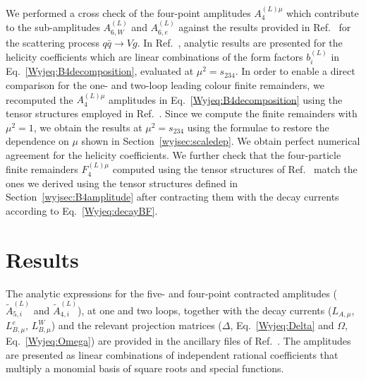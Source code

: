 \documentclass[main.tex]{subfiles}
\begin{document}
We performed a cross check of the four-point amplitudes $A_4^{(L)\mu}$ which contribute to the sub-amplitudes $A^{(L)}_{6,W}$ and $A^{(L)}_{6,e}$ against the results provided in Ref.~\cite{Gehrmann:2011ab} for the scattering process $q\bar{q}\to Vg$. In Ref.~\cite{Gehrmann:2011ab}, analytic results are presented 
for the helicity coefficients which are linear combinations of the form factors $b_i^{(L)}$ in Eq.~\ref{Wyjeq:B4decomposition}, evaluated at $\mu^2 = s_{234}$.
In order to enable a direct comparison for the one- and two-loop leading colour finite remainders, we 
recomputed the $A_4^{(L)\mu}$ amplitudes in Eq.~\ref{Wyjeq:B4decomposition} using the tensor structures employed in Ref.~\cite{Gehrmann:2011ab}.
Since we compute the finite remainders with $\mu^2=1$, we obtain the results at $\mu^2=s_{234}$ using the formulae to restore the dependence on $\mu$ shown in Section~\ref{wyjsec:scaledep}. We obtain perfect numerical agreement for the helicity coefficients. We further check that the four-particle finite remainders $F_4^{(L)\mu}$ computed using the tensor structures of Ref.~\cite{Gehrmann:2011ab} match the ones we derived using the tensor structures defined in Section~\ref{wyjsec:B4amplitude} after contracting them with the decay currents according to Eq.~\ref{Wyjeq:decayBF}.
\section{Results}
\label{wyjsec:results}
The analytic expressions for the five- and four-point contracted amplitudes ($\tilde{A}^{(L)}_{5,i}$ and $\tilde{A}^{(L)}_{4,i}$), at one and two loops, together with the decay currents ($L_{A,\mu}$, $L^{e}_{B,\mu}$, $L^{W}_{B,\mu}$) and the relevant projection matrices ($\Delta$, Eq.~\ref{Wyjeq:Delta} and $\Omega$, Eq.~\ref{Wyjeq:Omega}) are provided in the ancillary files of Ref.~\cite{Badger:2022ncb}. The amplitudes are presented as linear combinations of independent rational coefficients that multiply a monomial basis of square roots and special functions. 
\end{document}
